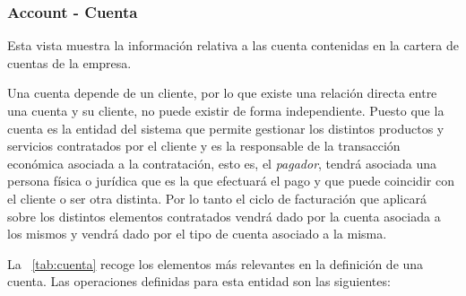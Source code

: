 \subsubsection{Account - Cuenta}
\label{sub:account}

Esta vista muestra la información relativa a las cuenta contenidas en la cartera de cuentas de la empresa.

Una cuenta depende de un cliente, por lo que existe una relación directa entre una cuenta y su cliente, no puede existir de forma independiente. Puesto que la cuenta es la entidad del sistema que permite gestionar los distintos productos y servicios contratados por el cliente y es la responsable de la transacción económica asociada a la contratación, esto es, el \textit{pagador}, tendrá asociada una persona física o jurídica que es la que efectuará el pago y que puede coincidir con el cliente o ser otra distinta. Por lo tanto el ciclo de facturación que aplicará sobre los distintos elementos contratados vendrá dado por la cuenta asociada a los mismos y vendrá dado por el tipo de cuenta asociado a la misma.


La \tablename~\ref{tab:cuenta} recoge los elementos más relevantes en la definición de una cuenta.
Las operaciones definidas para esta entidad son las siguientes:

